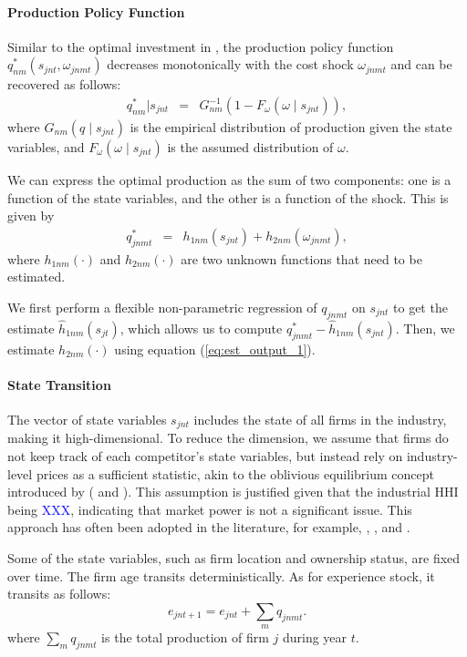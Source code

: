 \documentclass[12pt, letter]{article}
\begin{document}
\paragraph{Production Policy Function}
Similar to the optimal investment in \citet{bajari2007estimating}, the production policy function $q_{nm}^*(s_{jnt},\omega_{jnmt})$ decreases monotonically with the cost shock $\omega_{jnmt}$ and can be recovered as follows:
\begin{eqnarray}
q_{nm}^*|s_{jnt} &=& G_{nm}^{-1}(1-F_{\omega}(\omega\mid s_{jnt})), \label{eq:est_output_1}
\end{eqnarray}
where $G_{nm}(q\mid s_{jnt})$ is the empirical distribution of production given the state variables, and $F_{\omega}(\omega\mid s_{jnt})$ is the assumed distribution of $\omega$.

We can express the optimal production as the sum of two components: one is a function of the state variables, and the other is a function of the shock. This is given by 
\begin{eqnarray}
q_{jnmt}^* &=& h_{1nm}(s_{jnt})+h_{2nm}(\omega_{jnmt}),\label{eq:est_output_2}
\end{eqnarray}
where $h_{1nm}(\cdot)$ and $h_{2nm}(\cdot)$ are two unknown functions that need to be estimated.

We first perform a flexible non-parametric regression of $q_{jnmt}$ on $s_{jnt}$ to get the estimate $\hat{h}_{1nm}(s_{jt})$, which allows us to compute $q^*_{jnmt}-\hat{h}_{1nm}(s_{jnt})$. Then, we estimate $h_{2nm}(\cdot)$ using equation (\ref{eq:est_output_1}).

\paragraph{State Transition}
The vector of state variables $s_{jnt}$ includes the state of all firms in the industry, making it high-dimensional. To reduce the dimension, we assume that firms do not keep track of each competitor's state variables, but instead rely on industry-level prices as a sufficient statistic, akin to the oblivious equilibrium concept introduced by (\citet{weintraub2008markov} and \citet{benkard2015oblivious}). This assumption is justified given that the industrial HHI being \textcolor{blue}{XXX}, indicating that market power is not a significant issue. This approach has often been adopted in the literature, for example, \citet{jeon2022learning}, \citet{chen2023structural}, and \citet{barwick2025industrial}.

Some of the state variables, such as firm location and ownership status, are fixed over time. The firm age transits deterministically. As for experience stock, it transits as follows:
\[
e_{jnt+1}  =  e_{jnt} + \sum_m q_{jnmt}.
\]
where $\sum_m q_{jnmt}$ is the total production of firm $j$ during year $t$.
\end{document}
